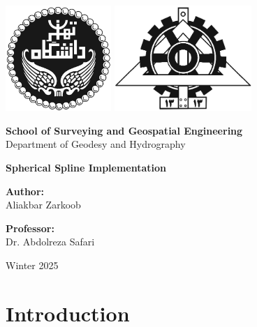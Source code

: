 \documentclass[12pt]{article}
\begin{document}
	
	\begin{titlepage}
		\begin{center}
			
			\includegraphics[height=4cm]{University_of_Tehran_Transparent_BW_logo.png} \hfill
			\includegraphics[height=4cm]{Fanni_Alt_BW_Logo.png}
			
			\vspace{1cm}
			
			\Large \textbf{School of Surveying and Geospatial Engineering}\\
			\large {Department of Geodesy and Hydrography}
			
			\vspace{3cm}
			
			\huge \textbf{Spherical Spline Implementation}
			
			\vspace{3cm}
			
			\Large \textbf{Author:}\\
			\Large Aliakbar Zarkoob
			
			\vspace{2cm}
			
			\Large \textbf{Professor:}\\
			Dr. Abdolreza Safari
			
			\vfill
			
			\large {Winter 2025}
			
		\end{center}
	\end{titlepage}
	
	
	\section{Introduction}
	
\end{document}
